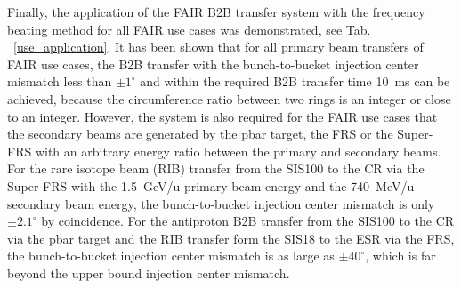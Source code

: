 Finally, the application of the FAIR B2B transfer system with the frequency beating method for all FAIR use cases was demonstrated, see Tab. ~\ref{use_application}. It has been shown that for all primary beam transfers of FAIR use cases, the B2B transfer with the bunch-to-bucket injection center mismatch less than $\pm1^\circ$ and within the required B2B transfer time \SI{10}{\ms} can be achieved, because the circumference ratio between two rings is an integer or close to an integer. However, the system is also required for the FAIR use cases that the secondary beams are generated by the pbar target, the FRS or the Super-FRS with an arbitrary energy ratio between the primary and secondary beams. For the rare isotope beam (RIB) transfer from the SIS100 to the CR via the Super-FRS with the \SI{1.5}{GeV/u} primary beam energy and the \SI{740}{MeV/u} secondary beam energy, the bunch-to-bucket injection center mismatch is only $\pm2.1^\circ$ by coincidence. For the antiproton B2B transfer from the SIS100 to the CR via the pbar target and the RIB transfer form the SIS18 to the ESR via the FRS, the bunch-to-bucket injection center mismatch is as large as $\pm40^\circ$, which is far beyond the upper bound injection center mismatch.


